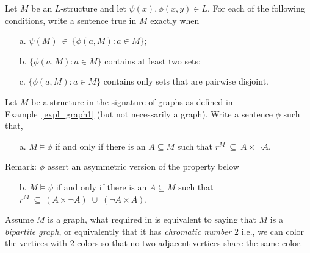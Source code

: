 
\bigskip

\smallskip

\begin{exercise}
Let $M$ be an $L$-structure and let $\psi(x), \phi(x,y)\in L$. For each of the following conditions, write a sentence true in $M$ exactly when
\begin{itemize}
\item[a.] $\psi(M)\ \in\ \big\{\phi(a,M): a\in M\big\}$;
\item[b.] $\big\{\phi(a,M): a\in M\big\}$ contains at least two sets;
\item[c.] $\big\{\phi(a,M): a\in M\big\}$ contains only sets that are pairwise disjoint.\QED
\end{itemize}
\end{exercise}

\begin{exercise}\label{ex_grafo_bipartito}
Let $M$ be a structure in the signature of graphs as defined in Example~\ref{expl_graph1} (but not necessarily a graph). Write a sentence $\phi$ such that, 
\begin{itemize} 
\item[a.] $M\models\phi$ if and only if there is an $A\subseteq M$ such that $r^M\ \subseteq\ A\times\neg A$.
\end{itemize}
Remark: $\phi$ assert an asymmetric version of the property below
\begin{itemize} 
\item[b.] $M\models\psi$ if and only if there is an $A\subseteq M$ such that $r^M\ \subseteq\ (A\times \neg A)\;\cup\;(\neg A\times A)$.
\end{itemize}
Assume $M$ is a graph, what required in  is equivalent to saying that $M$ is a \textit{bipartite graph}, or equivalently that it has \textit{chromatic number $2$\/} i.e., we can color the vertices with $2$ colors so that no two adjacent vertices share the same color.\QED
\end{exercise}


